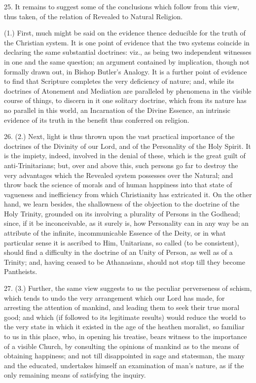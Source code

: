 25. It remains to suggest some of the conclusions which follow from
this view, thus taken, of the relation of Revealed to Natural
Religion.

(1.) First, much might be said on the evidence thence deducible for
the truth of the Christian system. It is one point of evidence that
the two systems coincide in declaring the same substantial doctrines:
viz., as being two independent witnesses in one and the same question;
an argument contained by implication, though not formally drawn out,
in Bishop Butler's Analogy. It is a further point of evidence to find
that Scripture completes the very deficiency of nature; and, while its
doctrines of Atonement and Mediation are paralleled by phenomena in
the visible course of things, to discern in it one solitary doctrine,
which from its nature has no parallel in this world, an Incarnation of
the Divine Essence, an intrinsic evidence of its truth in the benefit
thus conferred on religion.

26. (2.) Next, light is thus thrown upon the vast practical
importance of the doctrines of the Divinity of our Lord, and of the
Personality of the Holy Spirit. It is the impiety, indeed, involved in
the denial of these, which is the great guilt of anti-Trinitarians;
but, over and above this, such persons go far to destroy the very
advantages which the Revealed system possesses over the Natural; and
throw back the science of morals and of human happiness into that
state of vagueness and inefficiency from which Christianity has
extricated it. On the other hand, we learn besides, the shallowness of
the objection to the doctrine of the Holy Trinity, grounded on its
involving a plurality of Persons in the Godhead; since, if it be
inconceivable, as it surely is, how Personality can in any way be an
attribute of the infinite, incommunicable Essence of the Deity, or in
what particular sense it is ascribed to Him, Unitarians, so called (to
be consistent), should find a difficulty in the doctrine of an Unity
of Person, as well as of a Trinity; and, having ceased to be
Athanasians, should not stop till they become Pantheists.

27. (3.) Further, the same view suggests to us the peculiar
perverseness of schism, which tends to undo the very arrangement which
our Lord has made, for arresting the attention of mankind, and leading
them to seek their true moral good; and which (if followed to its
legitimate results) would reduce the world to the very state in which
it existed in the age of the heathen moralist, so familiar to us in
this place, who, in opening his treatise, bears witness to the
importance of a visible Church, by consulting the opinions of mankind
as to the means of obtaining happiness; and not till disappointed in
sage and statesman, the many and the educated, undertakes himself an
examination of man's nature, as if the only remaining means of
satisfying the inquiry.

